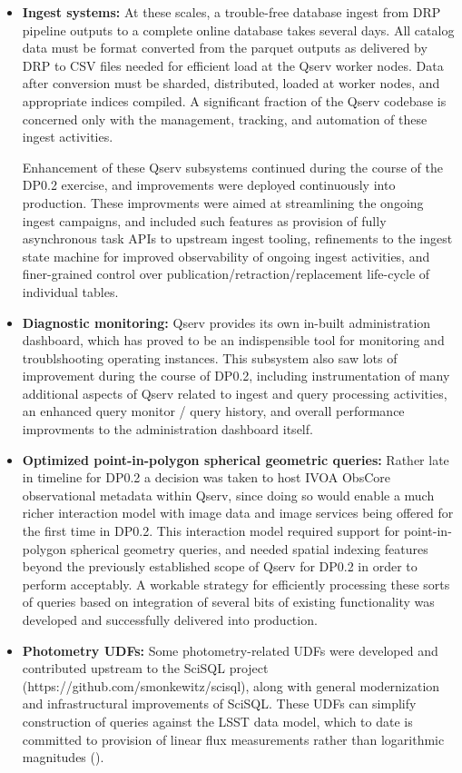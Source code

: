 \documentclass[OPS,authoryear,toc]{lsstdoc}
\begin{document}
\begin{itemize}

\item
  \textbf{Ingest systems:} At these scales, a trouble-free database ingest from DRP pipeline outputs to a
  complete online database takes several days.  All catalog data must be format converted from the parquet
  outputs as delivered by DRP to CSV files needed for efficient load at the Qserv worker nodes.  Data after
  conversion must be sharded, distributed, loaded at worker nodes, and appropriate indices compiled.  A
  significant fraction of the Qserv codebase is concerned only with the management, tracking, and automation
  of these ingest activities.

  Enhancement of these Qserv subsystems continued during the course of the DP0.2 exercise, and improvements
  were deployed continuously into production.  These improvments were aimed at streamlining the ongoing ingest
  campaigns, and included such features as provision of fully asynchronous task APIs to upstream ingest
  tooling, refinements to the ingest state machine for improved observability of ongoing ingest activities,
  and finer-grained control over publication/retraction/replacement life-cycle of individual tables.

\item
  \textbf{Diagnostic monitoring:} Qserv provides its own in-built administration dashboard, which has proved
  to be an indispensible tool for monitoring and troublshooting operating instances.  This subsystem also saw
  lots of improvement during the course of DP0.2, including instrumentation of many additional aspects of
  Qserv related to ingest and query processing activities, an enhanced query monitor / query history, and
  overall performance improvments to the administration dashboard itself.

\item
  \textbf{Optimized point-in-polygon spherical geometric queries:} Rather late in timeline for DP0.2 a
  decision was taken to host IVOA ObsCore observational metadata within Qserv, since doing so would enable a
  much richer interaction model with image data and image services being offered for the first time in DP0.2.
  This interaction model required support for point-in-polygon spherical geometry queries, and needed spatial
  indexing features beyond the previously established scope of Qserv for DP0.2 in order to perform acceptably.
  A workable strategy for efficiently processing these sorts of queries based on integration of several bits
  of existing functionality was developed and successfully delivered into production.

\item
  \textbf{Photometry UDFs:} Some photometry-related UDFs were developed and contributed upstream to the SciSQL
  project (https://github.com/smonkewitz/scisql), along with general modernization and infrastructural
  improvements of SciSQL.  These UDFs can simplify construction of queries against the LSST data model, which
  to date is committed to provision of linear flux measurements rather than logarithmic magnitudes
  ().

\end{itemize}
\end{document}
